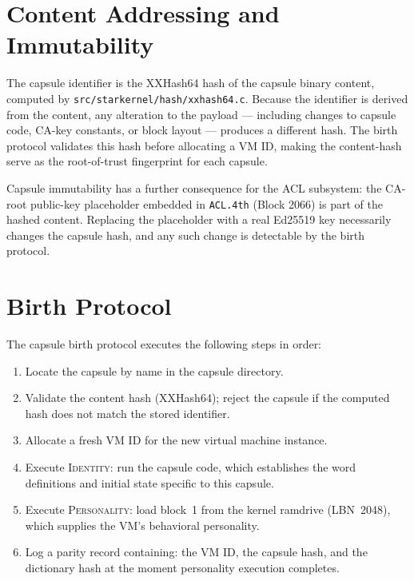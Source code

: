 \section{Content Addressing and Immutability}
\label{vol2:sec:capsules:hash}


The capsule identifier is the XXHash64 hash of the capsule binary content,
computed by \texttt{src/starkernel/hash/xxhash64.c}. Because the identifier
is derived from the content, any alteration to the payload --- including
changes to capsule code, CA-key constants, or block layout --- produces a
different hash. The birth protocol validates this hash before allocating a
VM ID, making the content-hash serve as the root-of-trust fingerprint for
each capsule.

Capsule immutability has a further consequence for the ACL subsystem: the
CA-root public-key placeholder embedded in \texttt{ACL.4th} (Block 2066)
is part of the hashed content. Replacing the placeholder with a real
Ed25519 key necessarily changes the capsule hash, and any such change is
detectable by the birth protocol.

\section{Birth Protocol}
\label{vol2:sec:capsules:birth}


The capsule birth protocol executes the following steps in order:

\begin{enumerate}
  \item Locate the capsule by name in the capsule directory.
  \item Validate the content hash (XXHash64); reject the capsule if the
        computed hash does not match the stored identifier.
  \item Allocate a fresh VM ID for the new virtual machine instance.
  \item Execute \textsc{Identity}: run the capsule code, which establishes
        the word definitions and initial state specific to this capsule.
  \item Execute \textsc{Personality}: load block~1 from the kernel ramdrive
        (LBN~2048), which supplies the VM's behavioral personality.
  \item Log a parity record containing: the VM ID, the capsule hash, and
        the dictionary hash at the moment personality execution completes.
\end{enumerate}

